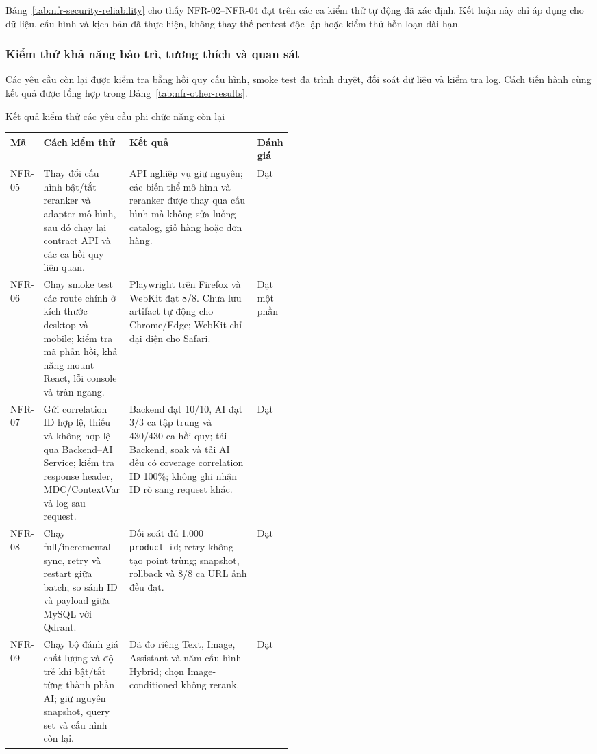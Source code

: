 Bảng~\ref{tab:nfr-security-reliability} cho thấy NFR-02--NFR-04 đạt trên các ca kiểm thử tự động đã xác định. Kết luận này chỉ áp dụng cho dữ liệu, cấu hình và kịch bản đã thực hiện, không thay thế pentest độc lập hoặc kiểm thử hỗn loạn dài hạn.

\subsubsection{Kiểm thử khả năng bảo trì, tương thích và quan sát}

Các yêu cầu còn lại được kiểm tra bằng hồi quy cấu hình, smoke test đa trình duyệt, đối soát dữ liệu và kiểm tra log. Cách tiến hành cùng kết quả được tổng hợp trong Bảng~\ref{tab:nfr-other-results}.

\begin{breakabletable}
\centering
\caption{Kết quả kiểm thử các yêu cầu phi chức năng còn lại}
\label{tab:nfr-other-results}
\footnotesize
\setlength{\tabcolsep}{3pt}
\renewcommand{\arraystretch}{0.98}
\begin{tabularx}{\linewidth}{|>{\centering\arraybackslash}p{0.08\linewidth}|>{\RaggedRight\arraybackslash}p{0.30\linewidth}|>{\RaggedRight\arraybackslash}X|>{\RaggedRight\arraybackslash}p{0.10\linewidth}|}
\hline
\textbf{Mã} & \textbf{Cách kiểm thử} & \textbf{Kết quả} & \textbf{Đánh giá} \\ \hline
NFR-05 & Thay đổi cấu hình bật/tắt reranker và adapter mô hình, sau đó chạy lại contract API và các ca hồi quy liên quan. & API nghiệp vụ giữ nguyên; các biến thể mô hình và reranker được thay qua cấu hình mà không sửa luồng catalog, giỏ hàng hoặc đơn hàng. & Đạt \\ \hline
NFR-06 & Chạy smoke test các route chính ở kích thước desktop và mobile; kiểm tra mã phản hồi, khả năng mount React, lỗi console và tràn ngang. & Playwright trên Firefox và WebKit đạt 8/8. Chưa lưu artifact tự động cho Chrome/Edge; WebKit chỉ đại diện cho Safari. & Đạt một phần \\ \hline
NFR-07 & Gửi correlation ID hợp lệ, thiếu và không hợp lệ qua Backend--AI Service; kiểm tra response header, MDC/ContextVar và log sau request. & Backend đạt 10/10, AI đạt 3/3 ca tập trung và 430/430 ca hồi quy; tải Backend, soak và tải AI đều có coverage correlation ID 100\%; không ghi nhận ID rò sang request khác. & Đạt \\ \hline
NFR-08 & Chạy full/incremental sync, retry và restart giữa batch; so sánh ID và payload giữa MySQL với Qdrant. & Đối soát đủ 1.000 \texttt{product\_id}; retry không tạo point trùng; snapshot, rollback và 8/8 ca URL ảnh đều đạt. & Đạt \\ \hline
NFR-09 & Chạy bộ đánh giá chất lượng và độ trễ khi bật/tắt từng thành phần AI; giữ nguyên snapshot, query set và cấu hình còn lại. & Đã đo riêng Text, Image, Assistant và năm cấu hình Hybrid; chọn Image-conditioned không rerank. & Đạt \\ \hline
\end{tabularx}
\end{breakabletable}

